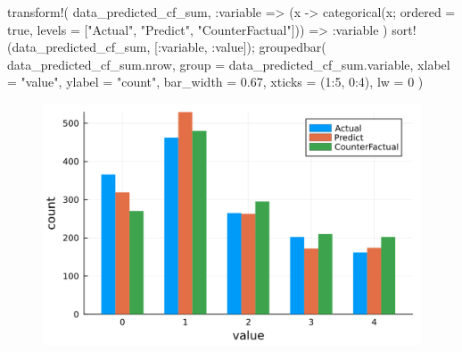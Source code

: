 \documentclass[
  letterpaper,
  DIV=11,
  numbers=noendperiod]{scrreprt}
\newenvironment{Shaded}{\begin{snugshade}}{\end{snugshade}}
\newcommand{\ConstantTok}[1]{\textcolor[rgb]{0.56,0.35,0.01}{#1}}
\newcommand{\FloatTok}[1]{\textcolor[rgb]{0.68,0.00,0.00}{#1}}
\newcommand{\FunctionTok}[1]{\textcolor[rgb]{0.28,0.35,0.67}{#1}}
\newcommand{\NormalTok}[1]{\textcolor[rgb]{0.00,0.23,0.31}{#1}}
\newcommand{\OperatorTok}[1]{\textcolor[rgb]{0.37,0.37,0.37}{#1}}
\newcommand{\StringTok}[1]{\textcolor[rgb]{0.13,0.47,0.30}{#1}}
\begin{document}
\begin{Shaded}
\begin{Highlighting}[]
\FunctionTok{transform!}\NormalTok{(}
\NormalTok{    data\_predicted\_cf\_sum, }
    \OperatorTok{:}\NormalTok{variable }\OperatorTok{=\textgreater{}} 
\NormalTok{    (x }\OperatorTok{{-}\textgreater{}} \FunctionTok{categorical}\NormalTok{(x; ordered }\OperatorTok{=} \ConstantTok{true}\NormalTok{, levels }\OperatorTok{=}\NormalTok{ [}\StringTok{"Actual"}\NormalTok{, }\StringTok{"Predict"}\NormalTok{, }\StringTok{"CounterFactual"}\NormalTok{])) }\OperatorTok{=\textgreater{}} 
    \OperatorTok{:}\NormalTok{variable}
\NormalTok{    )}
\FunctionTok{sort!}\NormalTok{(data\_predicted\_cf\_sum, [}\OperatorTok{:}\NormalTok{variable, }\OperatorTok{:}\NormalTok{value]);}
\FunctionTok{groupedbar}\NormalTok{(}
\NormalTok{    data\_predicted\_cf\_sum.nrow, }
\NormalTok{    group }\OperatorTok{=}\NormalTok{ data\_predicted\_cf\_sum.variable,}
\NormalTok{    xlabel }\OperatorTok{=} \StringTok{"value"}\NormalTok{, }
\NormalTok{    ylabel }\OperatorTok{=} \StringTok{"count"}\NormalTok{,}
\NormalTok{    bar\_width }\OperatorTok{=} \FloatTok{0.67}\NormalTok{,}
\NormalTok{    xticks }\OperatorTok{=}\NormalTok{ (}\FloatTok{1}\OperatorTok{:}\FloatTok{5}\NormalTok{, }\FloatTok{0}\OperatorTok{:}\FloatTok{4}\NormalTok{),}
\NormalTok{    lw }\OperatorTok{=} \FloatTok{0}
\NormalTok{)}
\end{Highlighting}
\end{Shaded}

\begin{figure}[H]

{\centering \includegraphics{./entry_exit_application_files/figure-pdf/cell-20-output-1.svg}

}

\end{figure}
\end{document}
